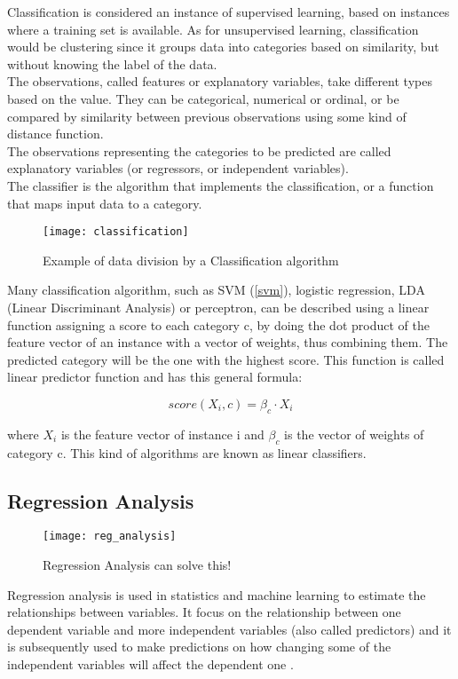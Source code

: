 Classification is considered an instance of supervised learning, based on instances where a training set is available. As for unsupervised learning, classification would be clustering since it groups data into categories based on similarity, but without knowing the label of the data.\\

The observations, called features or explanatory variables, take different types based on the value. They can be categorical, numerical or ordinal, or be compared by similarity between previous observations using some kind of distance function.\\
The observations representing the categories to be predicted are called explanatory variables (or regressors, or independent variables).\\
The classifier is the algorithm that implements the classification, or a function that maps input data to a category. \\

\begin{figure}[H]
	\centering
	\texttt{[image: classification]}
	\caption{Example of data division by a Classification algorithm}
	\label{fig:classification}
\end{figure}	

Many classification algorithm, such as SVM (\ref{svm}), logistic regression, LDA (Linear Discriminant Analysis) or perceptron, can be described using a linear function assigning a score to each category c, by doing the dot product of the feature vector of an instance with a vector of weights, thus combining them. The predicted category will be the one with the highest score. This function is called linear predictor function and has this general formula:

\begin{equation}
score(X_i, c) = \beta_c \cdot X_i
\end{equation}

where $X_i$ is the feature vector of instance i and $\beta_c$ is the vector of weights of category c. This kind of algorithms are known as linear classifiers.

\subsection{Regression Analysis} \label{regression}
\begin{figure}[H]
	\centering
	\texttt{[image: reg\_analysis]}
	\caption{Regression Analysis can solve this! \cite{reg_analisys}}
	\label{fig:reg_analysis}
\end{figure}
Regression analysis is used in statistics and machine learning to estimate the relationships between variables. It focus on the relationship between one dependent variable and more independent variables (also called predictors) and it is subsequently used to make predictions on how changing some of the  independent variables will affect the dependent one \cite{wiki:reg_an}. \\

